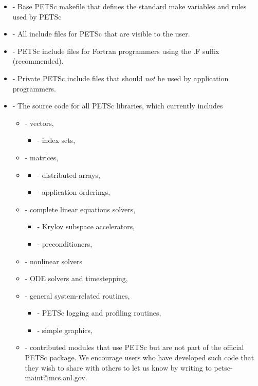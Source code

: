 \begin{itemize}
\item {} - Base PETSc makefile that defines the standard make variables and rules used by PETSc
\item {} - All include files for PETSc that are visible to the user.
\item {}    - PETSc include files for Fortran programmers using 
                                  the .F suffix (recommended).
\item {}    - Private PETSc include files that should {\em not} 
                                  be used by application programmers.
\item {} - The source code for all PETSc libraries, which
                  currently includes
 \begin{itemize}
 \item {} - vectors,
   \begin{itemize}
     \item {} - index sets,
   \end{itemize}
 \item {} - matrices,
 \item {}
   \begin{itemize}
    \item {} - distributed arrays,
    \item {} - application orderings,
   \end{itemize}
 \item {} - complete linear equations solvers,
 \begin{itemize}
   \item {} - Krylov subspace accelerators,
   \item {} - preconditioners,
 \end{itemize}
 \item {} - nonlinear solvers
 \item {} - ODE solvers and timestepping,
 \item {} - general system-related routines,
 \begin{itemize}
   \item {} - PETSc logging and profiling routines,
   \item {} - simple graphics,
 \end{itemize}
 \item {} - contributed modules that use PETSc but are not
    part of the official PETSc package.  We encourage users who have
    developed such code that they wish to share with others to let us
    know by writing to petsc-maint@mcs.anl.gov.
 \end{itemize}
\end{itemize}

